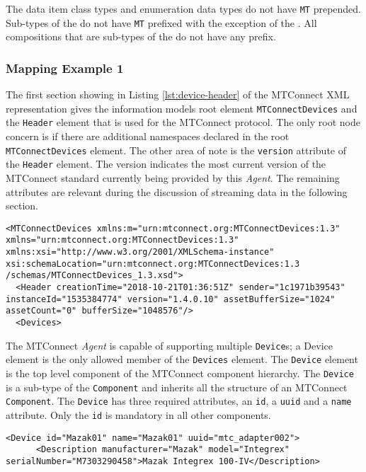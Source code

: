 The data item class types and enumeration data types do not have \texttt{MT} prepended. Sub-types of the  do not have \texttt{MT} prefixed with the exception of the . All compositions that are sub-types of the  do not have any prefix.

\subsubsection{Mapping Example 1}

The first section showing in Listing \ref{lst:device-header} of the MTConnect XML representation gives the information models root element \texttt{MTConnectDevices} and the \texttt{Header} element that is used for the MTConnect protocol. The only root node concern is if there are additional namespaces declared in the root \texttt{MTConnectDevices} element. The other area of note is the \texttt{version} attribute of the \texttt{Header} element.  The version indicates the most current version of the MTConnect standard currently being provided by this \textit{Agent}. The remaining attributes are relevant during the discussion of streaming data in the following section.

\begin{lstlisting}[caption={Device Header},label={lst:device-header}]
<MTConnectDevices xmlns:m="urn:mtconnect.org:MTConnectDevices:1.3" xmlns="urn:mtconnect.org:MTConnectDevices:1.3" xmlns:xsi="http://www.w3.org/2001/XMLSchema-instance" xsi:schemaLocation="urn:mtconnect.org:MTConnectDevices:1.3 /schemas/MTConnectDevices_1.3.xsd">
  <Header creationTime="2018-10-21T01:36:51Z" sender="1c1971b39543" instanceId="1535384774" version="1.4.0.10" assetBufferSize="1024" assetCount="0" bufferSize="1048576"/>
  <Devices>
\end{lstlisting}

The MTConnect \textit{Agent} is capable of supporting multiple \texttt{Device}s; a Device element is the only allowed member of the \texttt{Devices} element. The \texttt{Device} element is the top level component of the MTConnect component hierarchy. The \texttt{Device} is a sub-type of the \texttt{Component} and inherits all the structure of an MTConnect \texttt{Component}. The \texttt{Device} has three required attributes, an \texttt{id}, a \texttt{uuid} and a \texttt{name} attribute. Only the \texttt{id} is mandatory in all other components. 

\begin{lstlisting}[firstnumber=last,%
    caption={\texttt{Device} Element Mapping},label={lst:device-model-device}]
    <Device id="Mazak01" name="Mazak01" uuid="mtc_adapter002">
      <Description manufacturer="Mazak" model="Integrex" serialNumber="M7303290458">Mazak Integrex 100-IV</Description>
\end{lstlisting}

